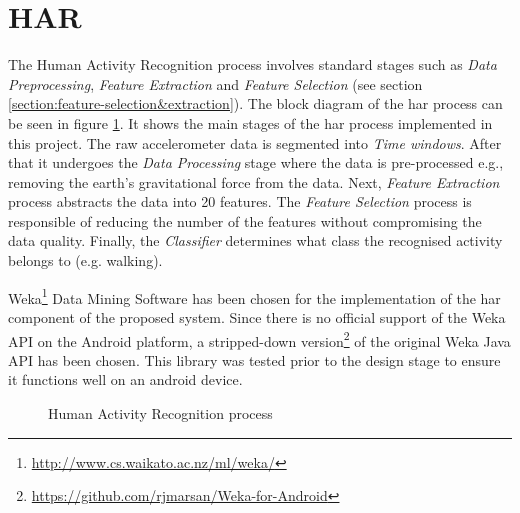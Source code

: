    \section{HAR}
    The Human Activity Recognition process involves standard stages such as \textit{Data Preprocessing}, \textit{Feature Extraction} and \textit{Feature Selection} (see section \ref{section:feature-selection&extraction}). The block diagram of the \gls{har} process can be seen in figure \ref{fig:har_process}. It shows the main stages of the \gls{har} process implemented in this project. The raw accelerometer data is segmented into \textit{Time windows}. After that it undergoes the \textit{Data Processing} stage where the data is pre-processed e.g., removing the earth's gravitational force from the data. Next, \textit{Feature Extraction} process abstracts the data into 20 features. The \textit{Feature Selection} process is responsible of reducing the number of the features without compromising the data quality. Finally, the \textit{Classifier} determines what class the recognised activity belongs to (e.g. walking).
    
    Weka\footnote{\url{http://www.cs.waikato.ac.nz/ml/weka/}} Data Mining Software has been chosen for the implementation of the \gls{har} component of the proposed system. Since there is no official support of the Weka API on the Android platform, a stripped-down version\footnote{\url{https://github.com/rjmarsan/Weka-for-Android}} of the original Weka Java API has been chosen. This library was tested prior to the design stage to ensure it functions well on an android device. 
    
    \begin{figure}[H]
        \centering
        \caption{Human Activity Recognition process}
        \label{fig:har_process}
    \end{figure}
    
